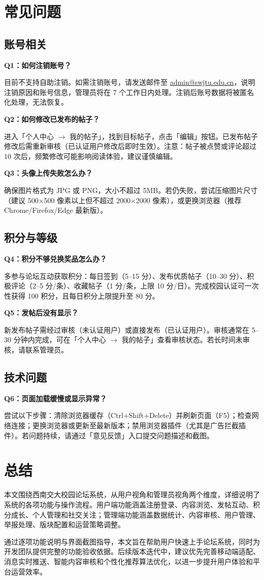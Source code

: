 \documentclass[12pt,a4paper]{article}
\begin{document}
\section{常见问题}

\subsection{账号相关}
\textbf{Q1：如何注销账号？}

目前不支持自助注销。如需注销账号，请发送邮件至 \url{admin@swjtu.edu.cn}，说明注销原因和账号信息，管理员将在 7 个工作日内处理。注销后账号数据将被匿名化处理，无法恢复。

\textbf{Q2：如何修改已发布的帖子？}

进入「个人中心 $\rightarrow$ 我的帖子」，找到目标帖子，点击「编辑」按钮。已发布帖子修改后需重新审核（已认证用户修改后即时生效）。注意：帖子被点赞或评论超过 10 次后，频繁修改可能影响阅读体验，建议谨慎编辑。

\textbf{Q3：头像上传失败怎么办？}

确保图片格式为 JPG 或 PNG，大小不超过 5MB。若仍失败，尝试压缩图片尺寸（建议 500$\times$500 像素以上但不超过 2000$\times$2000 像素），或更换浏览器（推荐 Chrome/Firefox/Edge 最新版）。

\subsection{积分与等级}

\textbf{Q4：积分不够兑换奖品怎么办？}

多参与论坛互动获取积分：每日签到（5--15 分）、发布优质帖子（10--30 分）、积极评论（2--5 分/条）、收藏帖子（1 分/条，上限 10 分/日）。完成校园认证可一次性获得 100 积分，且每日积分上限提升至 80 分。

\textbf{Q5：发帖后没有显示？}

新发布帖子需经过审核（未认证用户）或直接发布（已认证用户）。审核通常在 5--30 分钟内完成，可在「个人中心 $\rightarrow$ 我的帖子」查看审核状态。若长时间未审核，请联系管理员。

\subsection{技术问题}

\textbf{Q6：页面加载缓慢或显示异常？}

尝试以下步骤：清除浏览器缓存（Ctrl+Shift+Delete）并刷新页面（F5）；检查网络连接；更换浏览器或更新至最新版本；禁用浏览器插件（尤其是广告拦截插件）。若问题持续，请通过「意见反馈」入口提交问题描述和截图。



\section{总结}

本文围绕西南交大校园论坛系统，从用户视角和管理员视角两个维度，详细说明了系统的各项功能与操作流程。用户端功能涵盖注册登录、内容浏览、发帖互动、积分成长、个人管理和社交关注；管理端功能涵盖数据统计、内容审核、用户管理、举报处理、版块配置和运营策略调整。

通过逐项功能说明与界面截图指导，本文旨在帮助用户快速上手论坛系统，同时为开发团队提供完整的功能验收依据。后续版本迭代中，建议优先完善移动端适配、消息实时推送、智能内容审核和个性化推荐算法优化，以进一步提升用户体验和平台运营效率。
\end{document}
